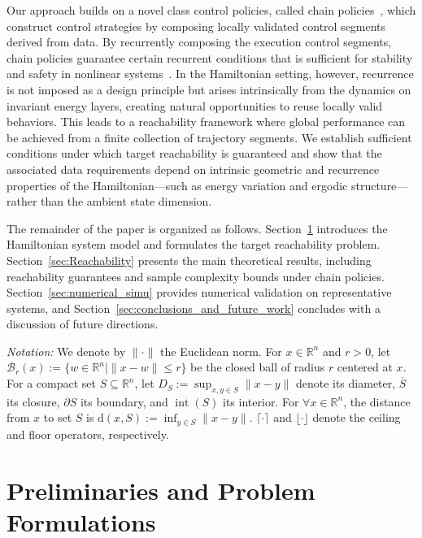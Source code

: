 \documentclass[letterpaper, 10 pt, conference]{ieeeconf}
\newcommand{\cB}{\mathcal{B}}
\begin{document}
Our approach builds on a novel class control policies, called  chain policies~\cite{siegelmann2025data}, which construct control strategies by composing locally validated control segments derived from data. By recurrently composing the execution control segments, chain policies guarantee certain recurrent conditions that is sufficient for stability and safety in nonlinear systems~\cite{siegelmann2023recurrence,sibai2026recurrence,liu2025recurrent,liu2025safety}. In the Hamiltonian setting, however, recurrence is not imposed as a design principle but arises intrinsically from the dynamics on invariant energy layers, creating natural opportunities to reuse locally valid behaviors. This leads to a reachability framework where global performance can be achieved from a finite collection of trajectory segments. We establish sufficient conditions under which target reachability is guaranteed and show that the associated data requirements depend on intrinsic geometric and recurrence properties of the Hamiltonian—such as energy variation and ergodic structure—rather than the ambient state dimension.

The remainder of the paper is organized as follows. Section~\ref{sec:preliminaries} introduces the Hamiltonian system model and formulates the target reachability problem. Section~\ref{sec:Reachability} presents the main theoretical results, including reachability guarantees and sample complexity bounds under chain policies. Section~\ref{sec:numerical_simu} provides numerical validation on representative systems, and Section~\ref{sec:conclusions_and_future_work} concludes with a discussion of future directions.

\vspace{1ex}
\noindent\emph{Notation:}
We denote by $\|\cdot\|$ the Euclidean norm. For $x \in \mathbb{R}^n$ and $r>0$, let $\cB_r(x) := \{ w \in \mathbb{R}^n \mid \|x-w\| \le r \}$ be the closed ball of radius $r$ centered at $x$. For a compact set $S\subseteq \mathbb{R}^n$, let $D_S:=\sup_{x,y\in S}\|x-y\|$ denote its diameter, $\overline{S}$ its closure, $\partial S$ its boundary, and $\operatorname{int}(S)$ its interior. For  $\forall x\in\mathbb{R}^n$, the distance from $x$ to set $S$ is $\mathrm{d}(x,S):=\inf_{y\in S}\|x-y\|$. $\lceil \cdot \rceil$ and $\lfloor \cdot \rfloor$ denote the ceiling and floor operators, respectively.


\section{Preliminaries and Problem Formulations}
\label{sec:preliminaries}
\end{document}
